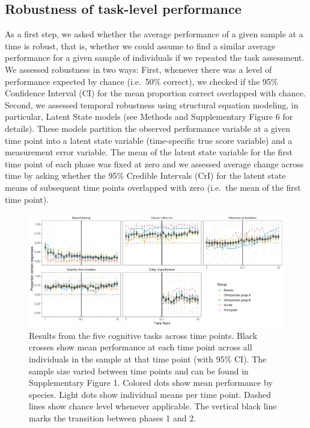 \documentclass[
  man,floatsintext]{apa6}
\begin{document}
\hypertarget{robustness-of-task-level-performance}{%
\subsection{Robustness of task-level performance}\label{robustness-of-task-level-performance}}

As a first step, we asked whether the average performance of a given sample at a time is robust, that is, whether we could assume to find a similar average performance for a given sample of individuals if we repeated the task assessment. We assessed robustness in two ways: First, whenever there was a level of performance expected by chance (i.e.~50\% correct), we checked if the 95\% Confidence Interval (CI) for the mean proportion correct overlapped with chance. Second, we assessed temporal robustness using structural equation modeling, in particular, Latent State models (see Methods and Supplementary Figure 6 for details). These models partition the observed performance variable at a given time point into a latent state variable (time-specific true score variable) and a measurement error variable. The mean of the latent state variable for the first time point of each phase was fixed at zero and we assessed average change across time by asking whether the 95\% Credible Intervals (CrI) for the latent state means of subsequent time points overlapped with zero (i.e.~the mean of the first time point).

\begin{figure}
\includegraphics[width=1\linewidth]{./figures/performance} \caption{Results from the five cognitive tasks across time points. Black crosses show mean performance at each time point across all individuals in the sample at that time point (with 95\% CI). The sample size varied between time points and can be found in Supplementary Figure 1. Colored dots show mean performance by species. Light dots show individual means per time point. Dashed lines show chance level whenever applicable. The vertical black line marks the transition between phases 1 and 2.}\label{fig:perfplot}
\end{figure}
\end{document}
